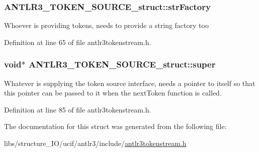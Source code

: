 \hypertarget{struct_a_n_t_l_r3___t_o_k_e_n___s_o_u_r_c_e__struct_ab65d5aa5431af0423d02ee9777417bd9}{
\subsubsection[{str\-Factory}]{ A\-N\-T\-L\-R3\-\_\-\-T\-O\-K\-E\-N\-\_\-\-S\-O\-U\-R\-C\-E\-\_\-struct\-::str\-Factory}}\label{struct_a_n_t_l_r3___t_o_k_e_n___s_o_u_r_c_e__struct_ab65d5aa5431af0423d02ee9777417bd9}
Whoever is providing tokens, needs to provide a string factory too 

Definition at line 65 of file antlr3tokenstream.\-h.

\hypertarget{struct_a_n_t_l_r3___t_o_k_e_n___s_o_u_r_c_e__struct_a8ea66f6d566682d41b763ff27f6a0916}{
\subsubsection[{super}]{\setlength{\rightskip}{0pt plus 5cm}void$\ast$ A\-N\-T\-L\-R3\-\_\-\-T\-O\-K\-E\-N\-\_\-\-S\-O\-U\-R\-C\-E\-\_\-struct\-::super}}\label{struct_a_n_t_l_r3___t_o_k_e_n___s_o_u_r_c_e__struct_a8ea66f6d566682d41b763ff27f6a0916}
Whatever is supplying the token source interface, needs a pointer to itself so that this pointer can be passed to it when the next\-Token function is called. 

Definition at line 85 of file antlr3tokenstream.\-h.



The documentation for this struct was generated from the following file\-:\begin{DoxyCompactItemize}
\item 
libs/structure\-\_\-\-I\-O/ucif/antlr3/include/\hyperlink{antlr3tokenstream_8h}{antlr3tokenstream.\-h}\end{DoxyCompactItemize}
